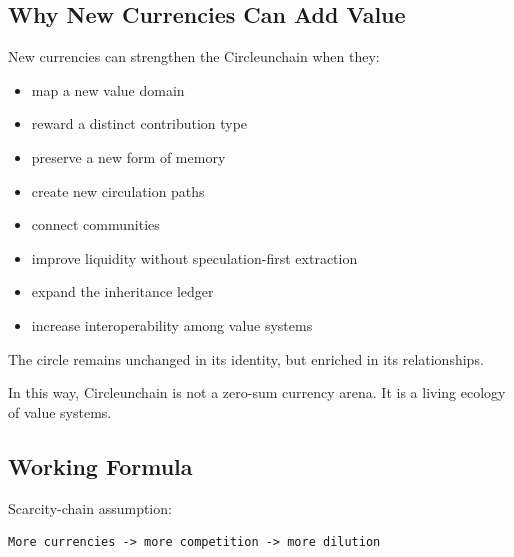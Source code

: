 ﻿\documentclass[12pt]{article}
\begin{document}
\subsection{Why New Currencies Can Add Value}


New currencies can strengthen the Circleunchain when they:

\begin{itemize}
  \item map a new value domain
\end{itemize}
\begin{itemize}
  \item reward a distinct contribution type
\end{itemize}
\begin{itemize}
  \item preserve a new form of memory
\end{itemize}
\begin{itemize}
  \item create new circulation paths
\end{itemize}
\begin{itemize}
  \item connect communities
\end{itemize}
\begin{itemize}
  \item improve liquidity without speculation-first extraction
\end{itemize}
\begin{itemize}
  \item expand the inheritance ledger
\end{itemize}
\begin{itemize}
  \item increase interoperability among value systems
\end{itemize}

The circle remains unchanged in its identity, but enriched in its relationships.

In this way, Circleunchain is not a zero-sum currency arena. It is a living ecology of value systems.

\subsection{Working Formula}


Scarcity-chain assumption:

\begin{verbatim}
More currencies -> more competition -> more dilution
\end{verbatim}
\end{document}
